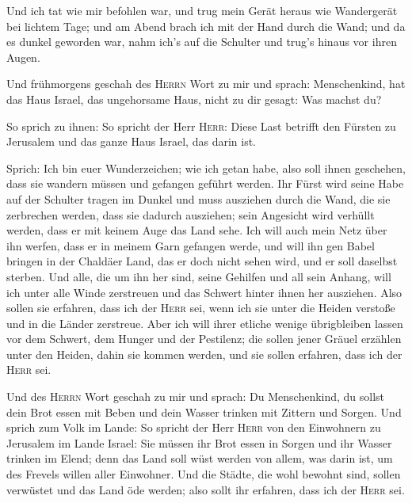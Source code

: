  Und ich tat wie mir befohlen war, und trug mein Gerät
heraus wie Wandergerät bei lichtem Tage; und am Abend brach ich mit der
Hand durch die Wand; und da es dunkel geworden war, nahm ich's auf die
Schulter und trug's hinaus vor ihren Augen.

 Und frühmorgens geschah des \textsc{Herrn} Wort zu mir
und sprach:  Menschenkind, hat das Haus Israel, das
ungehorsame Haus, nicht zu dir gesagt: Was machst du?

 So sprich zu ihnen: So spricht der Herr \textsc{Herr}:
Diese Last betrifft den Fürsten zu Jerusalem und das ganze Haus Israel,
das darin ist.

 Sprich: Ich bin euer Wunderzeichen; wie ich getan habe,
also soll ihnen geschehen, dass sie wandern müssen und gefangen geführt
werden.  Ihr Fürst wird seine Habe auf der Schulter
tragen im Dunkel und muss ausziehen durch die Wand, die sie zerbrechen
werden, dass sie dadurch ausziehen; sein Angesicht wird verhüllt werden,
dass er mit keinem Auge das Land sehe.  Ich will auch
mein Netz über ihn werfen, dass er in meinem Garn gefangen werde, und
will ihn gen Babel bringen in der Chaldäer Land, das er doch nicht sehen
wird, und er soll daselbst sterben.  Und alle, die um ihn
her sind, seine Gehilfen und all sein Anhang, will ich unter alle Winde
zerstreuen und das Schwert hinter ihnen her ausziehen. 
Also sollen sie erfahren, dass ich der \textsc{Herr} sei, wenn ich sie
unter die Heiden verstoße und in die Länder zerstreue. 
Aber ich will ihrer etliche wenige übrigbleiben lassen vor dem Schwert,
dem Hunger und der Pestilenz; die sollen jener Gräuel erzählen unter den
Heiden, dahin sie kommen werden, und sie sollen erfahren, dass ich der
\textsc{Herr} sei.

 Und des \textsc{Herrn} Wort geschah zu mir und sprach:
 Du Menschenkind, du sollst dein Brot essen mit Beben und
dein Wasser trinken mit Zittern und Sorgen.  Und sprich
zum Volk im Lande: So spricht der Herr \textsc{Herr} von den Einwohnern
zu Jerusalem im Lande Israel: Sie müssen ihr Brot essen in Sorgen und
ihr Wasser trinken im Elend; denn das Land soll wüst werden von allem,
was darin ist, um des Frevels willen aller Einwohner. 
Und die Städte, die wohl bewohnt sind, sollen verwüstet und das Land öde
werden; also sollt ihr erfahren, dass ich der \textsc{Herr} sei.

